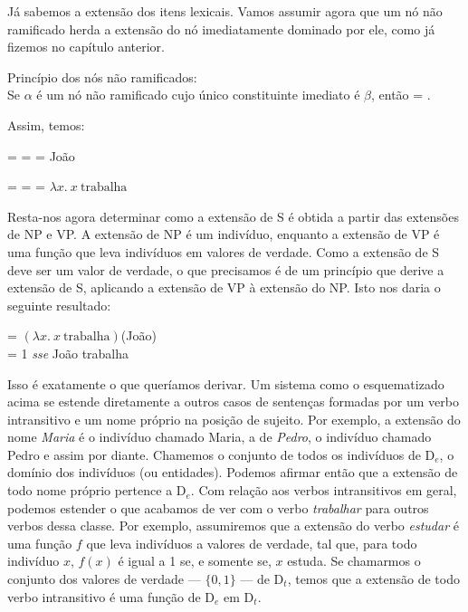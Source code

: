 \n Já sabemos a extensão dos itens lexicais. Vamos assumir
agora que um nó não ramificado herda a extensão do nó
imediatamente dominado por ele, como já fizemos no capítulo
anterior.

\begin{exe}
	\ex Princípio dos nós não ramificados:\\
	Se $\alpha$ é um nó não ramificado cujo único constituinte imediato é $\beta$, então \den{$\alpha$} = \den{$\beta$}.
\end{exe}

\n Assim, temos:

\begin{exe}
	\ex {} =  =  = João
\end{exe} 

\begin{exe}
	\ex {} =  =  = $\lambda x.\ x\ \text{trabalha}$
\end{exe}

\noindent Resta-nos agora determinar como a extensão de S é obtida
a partir das extensões de NP e VP. A extensão de NP é um
indivíduo, enquanto a extensão de VP é uma função que leva
indivíduos em valores de verdade. Como a extensão de S deve ser um valor
de verdade, o que precisamos é de um princípio que
derive a extensão de S, aplicando a extensão de VP à extensão do NP. Isto nos daria o seguinte resultado:

\begin{exe}
	\ex {} = $(\lambda x.\ x\ \text{trabalha})$(João)\\
	 = 1 \textit{sse} João trabalha
\end{exe}

\noindent Isso é exatamente o que queríamos derivar. Um sistema
como o esquematizado acima se estende diretamente a outros casos
de sentenças formadas por um verbo intransitivo e um nome
próprio na posição de sujeito. Por exemplo, a extensão do nome
\textit{Maria} é o indivíduo chamado Maria, a de \textit{Pedro}, o indivíduo
chamado Pedro e assim por diante. Chamemos o conjunto de todos os
indivíduos de D$_{e}$, o domínio dos indivíduos (ou
entidades). Podemos afirmar então que a extensão de todo nome
próprio pertence a D$_{e}$. Com relação aos verbos
intransitivos em geral, podemos estender o que acabamos de ver com
o verbo \textit{trabalhar} para outros verbos dessa classe. Por exemplo,
assumiremos que a extensão do verbo \textit{estudar} é uma função $f$ que
leva indivíduos a valores de verdade, tal que, para todo indivíduo
$x$, $f(x)$ é igual a 1 se, e somente se, $x$
estuda. Se chamarmos o conjunto dos valores de verdade --- $\{0,1\}$ --- de
D$_{t}$, temos que a extensão de todo verbo intransitivo é
uma função de D$_{e}$ em D$_{t}$.

